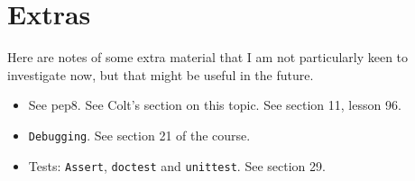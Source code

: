 \section{Extras}

Here are notes of some extra material that I am not particularly keen to investigate now, but that might be useful in the future. 

\begin{itemize}
    \item See pep8. See Colt's section on this topic. See section 11, lesson 96.
    \item \verb|Debugging|. See section 21 of the course.
    \item Tests: \verb|Assert|, \verb|doctest| and \verb|unittest|. See section 29.
\end{itemize}